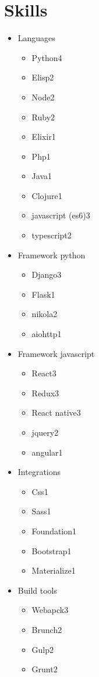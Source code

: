 \documentclass[11pt,letter,sans]{moderncv}
\begin{document}
\section{Skills}
  \begin{itemize}
      \item Languages
      \begin{itemize}
\item Python\hfill 4\item Elisp\hfill 2\item Node\hfill 2\item Ruby\hfill 2\item Elixir\hfill 1\item Php\hfill 1\item Java\hfill 1\item Clojure\hfill 1\item javascript (es6)\hfill 3\item typescript\hfill 2\end{itemize}
      \item Framework python
      \begin{itemize}
\item Django\hfill 3\item Flask\hfill 1\item nikola\hfill 2\item aiohttp\hfill 1\end{itemize}
      \item Framework javascript
      \begin{itemize}
\item React\hfill 3\item Redux\hfill 3\item React native\hfill 3\item jquery\hfill 2\item angular\hfill 1\end{itemize}
      \item Integrations
      \begin{itemize}
\item Css\hfill 1\item Sass\hfill 1\item Foundation\hfill 1\item Bootstrap\hfill 1\item Materialize\hfill 1\end{itemize}
      \item Build tools
      \begin{itemize}
\item Webapck\hfill 3\item Brunch\hfill 2\item Gulp\hfill 2\item Grunt\hfill 2\end{itemize}

\end{itemize}
\end{document}
